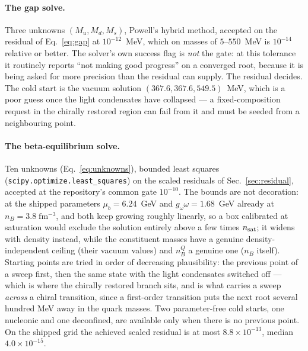 \documentclass[aps,prc,onecolumn,superscriptaddress,nofootinbib,10pt]{revtex4-2}
\newcommand{\nB}{n_B}
\begin{document}
\paragraph{The gap solve.} Three unknowns $(M_u, M_d, M_s)$, Powell's hybrid
method, accepted on the residual of Eq.~\eqref{eq:gap} at
$10^{-12}$~MeV, which on masses of $5$--$550$~MeV is $10^{-14}$ relative or
better. The solver's own success flag is \emph{not} the gate: at this
tolerance it routinely reports ``not making good progress'' on a converged
root, because it is being asked for more precision than the residual can
supply. The residual decides. The cold start is the vacuum solution
$(367.6, 367.6, 549.5)$~MeV, which is a poor guess once the light condensates
have collapsed --- a fixed-composition request in the chirally restored region
can fail from it and must be seeded from a neighbouring point.

\paragraph{The beta-equilibrium solve.} Ten unknowns
(Eq.~\ref{eq:unknowns}), bounded least squares
(\texttt{scipy.optimize.least\_squares}) on the scaled residuals of
Sec.~\ref{sec:residual}, accepted at the repository's common gate
$10^{-10}$. The bounds are not decoration: at the shipped parameters
$\mu_b = 6.24$~GeV and $g_\omega\omega = 1.68$~GeV already at
$\nB = 3.8\;\mathrm{fm^{-3}}$, and both keep growing roughly linearly, so a
box calibrated at saturation would exclude the solution entirely above a few
times $n_{\rm sat}$; it widens with density instead, while the constituent
masses have a genuine
density-independent ceiling (their vacuum values) and $\nB^Q$ a genuine one
($\nB$ itself). Starting points are tried in order of decreasing
plausibility: the previous point of a sweep first, then the same state with
the light condensates switched off --- which is where the chirally restored
branch sits, and is what carries a sweep \emph{across} a chiral transition,
since a first-order transition puts the next root several hundred MeV away in
the quark masses. Two parameter-free cold starts, one nucleonic and one
deconfined, are available only when there is no previous point. On the shipped
grid the achieved scaled residual is at most $8.8\times10^{-13}$, median
$4.0\times10^{-15}$.
\end{document}
